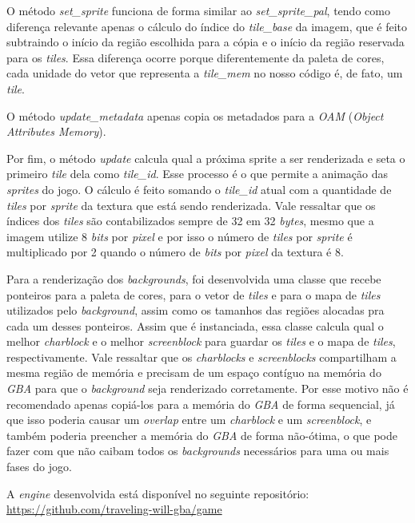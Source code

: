 O método \textit{set\_sprite} funciona de forma similar ao \textit{set\_sprite\_pal}, tendo como diferença relevante apenas o cálculo do índice do \textit{tile\_base} da imagem, que é feito subtraindo o início da região escolhida para a cópia e o início da região reservada para os \textit{tiles}. Essa diferença ocorre porque diferentemente da paleta de cores, cada unidade do vetor que representa a \textit{tile\_mem} no nosso código é, de fato, um \textit{tile}.

O método \textit{update\_metadata} apenas copia os metadados para a \textit{OAM} (\textit{Object Attributes Memory}).

Por fim, o método \textit{update} calcula qual a próxima sprite a ser renderizada e seta o primeiro \textit{tile} dela como \textit{tile\_id}. Esse processo é o que permite a animação das \textit{sprites} do jogo. O cálculo é feito somando o \textit{tile\_id} atual com a quantidade de \textit{tiles} por \textit{sprite} da textura que está sendo renderizada. Vale ressaltar que os índices dos \textit{tiles} são contabilizados sempre de 32 em 32 \textit{bytes}, mesmo que a imagem utilize 8 \textit{bits} por \textit{pixel} e por isso o número de \textit{tiles} por \textit{sprite} é multiplicado por 2 quando o número de \textit{bits} por \textit{pixel} da textura é 8.

Para a renderização dos \textit{backgrounds}, foi desenvolvida uma classe que recebe ponteiros para a paleta de cores,  para o vetor de \textit{tiles} e para o mapa de \textit{tiles} utilizados pelo \textit{background}, assim como os tamanhos das regiões alocadas pra cada um desses ponteiros. Assim que é instanciada, essa classe calcula qual o melhor \textit{charblock} e o melhor \textit{screenblock} para guardar os \textit{tiles} e o mapa de \textit{tiles}, respectivamente. Vale ressaltar que os \textit{charblocks} e \textit{screenblocks} compartilham a mesma região de memória e precisam de um espaço contíguo na memória do \textit{GBA} para que o \textit{background} seja renderizado corretamente. Por esse motivo não é recomendado apenas copiá-los para a memória do \textit{GBA} de forma sequencial, já que isso poderia causar um \textit{overlap} entre um \textit{charblock} e um \textit{screenblock}, e também poderia preencher a memória do \textit{GBA} de forma não-ótima, o que pode fazer com que não caibam todos os \textit{backgrounds} necessários para uma ou mais fases do jogo.

A \textit{engine} desenvolvida está disponível no seguinte repositório: \url{https://github.com/traveling-will-gba/game}
